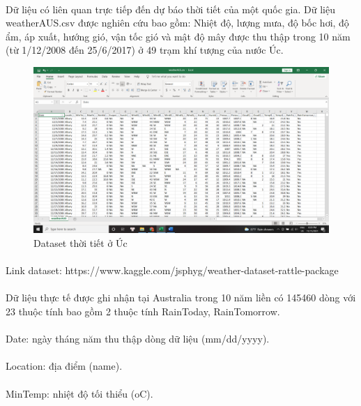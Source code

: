 \documentclass{article}
\begin{document}
\paragraph{}
	Dữ liệu có liên quan trực tiếp đến dự báo thời tiết của một quốc gia. Dữ liệu weatherAUS.csv được nghiên cứu bao gồm: Nhiệt độ, lượng mưa, độ bốc hơi, độ ẩm, áp xuất, hướng gió, vận tốc gió và mật độ mây được thu thập trong 10 năm (từ 1/12/2008 đến 25/6/2017) ở 49 trạm khí tượng của nước Úc.
    \begin{figure}[!h]
	\begin{center}
		\includegraphics[width=\linewidth]{images/dataset.png}
		\caption{\fontsize{14}{20}\selectfont Dataset thời tiết ở Úc}      
	\end{center}
\end{figure}
\paragraph{}
    Link dataset: https://www.kaggle.com/jsphyg/weather-dataset-rattle-package
\paragraph{} Dữ liệu thực tế được ghi nhận tại Australia trong 10 năm liền có 145460 dòng với 23 thuộc tính bao gồm 2 thuộc tính RainToday, RainTomorrow.
\paragraph{} Date: ngày tháng năm thu thập dòng dữ liệu (mm/dd/yyyy).
\paragraph{} Location: địa điểm (name).
\paragraph{} MinTemp: nhiệt độ tối thiểu (oC).
\end{document}
